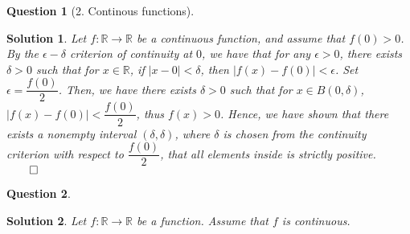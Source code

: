 \documentclass{article} %
\theoremstyle{quest}
\newtheorem*{question}{Question}
\newtheorem*{solution}{Solution}
\begin{document}
\bigskip

\begin{question}[2. Continous functions]
\end{question}
\begin{solution}
Let $f:\mathbb{R} \to \mathbb{R}$ be a continuous function, and assume that $f(0) > 0$. By the $\epsilon-\delta$
criterion of continuity at $0$, we have that for any $\epsilon > 0$, there exists $\delta > 0$ such that for $x \in 
\mathbb{R}$, if $|x - 0| < \delta$, then $|f(x) - f(0)| < \epsilon$. Set $\epsilon = \dfrac{f(0)}{2}$. Then, 
we have there exists $\delta > 0$ such that for $x \in B(0,\delta)$, $|f(x) - f(0)| < \dfrac{f(0)}{2}$, thus
$f(x) > 0$. Hence, we have shown that there exists a nonempty interval $(\delta, \delta)$, where $\delta$ is chosen
from the continuity criterion with respect to $\dfrac{f(0)}{2}$, that all elements inside is strictly positive.
$\qed$
\end{solution}

\begin{question}
\end{question}
\begin{solution}
Let $f:\mathbb{R} \to \mathbb{R}$ be a function. Assume that $f$ is continuous.  
\end{solution}
\end{document}
